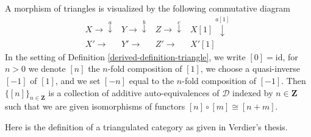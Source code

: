 A morphism of triangles is visualized by the following
commutative diagram
$$
\begin{array}{cccc}X \longrightarrow\overset{a}{\downarrow} & Y \longrightarrow\overset{b}{\downarrow} & Z \longrightarrow\overset{c}{\downarrow} & X[1] \overset{a[1]}{\downarrow} \\ X' \longrightarrow & Y' \longrightarrow & Z' \longrightarrow & X'[1]\end{array}
$$
In the setting of Definition \ref{derived-definition-triangle}, we
write $[0] = \text{id}$, for $n > 0$ we denote $[n]$ the $n$-fold
composition of $[1]$, we choose a quasi-inverse $[-1]$ of $[1]$, and
we set $[-n]$ equal to the $n$-fold composition of $[-1]$. Then
$\{[n]\}_{n \in \mathbf{Z}}$ is a collection of additive auto-equivalences
of $\mathcal{D}$ indexed by $n \in \mathbf{Z}$ such that we are given
isomorphisms of functors $[n] \circ [m] \cong [n + m]$.

\medskip\noindent
Here is the definition of a triangulated category as given in
Verdier's thesis.

